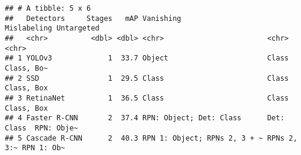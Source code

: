 \begin{verbatim}
## # A tibble: 5 x 6
##   Detectors     Stages   mAP Vanishing                    Mislabeling Untargeted
##   <chr>          <dbl> <dbl> <chr>                        <chr>       <chr>     
## 1 YOLOv3             1  33.7 Object                       Class       Class, Bo~
## 2 SSD                1  29.5 Class                        Class       Class, Box
## 3 RetinaNet          1  36.5 Class                        Class       Class, Box
## 4 Faster R-CNN       2  37.4 RPN: Object; Det: Class      Det: Class  RPN: Obje~
## 5 Cascade R-CNN      2  40.3 RPN 1: Object; RPNs 2, 3 + ~ RPNs 2, 3:~ RPN 1: Ob~
\end{verbatim}

\begin{Shaded}
\begin{Highlighting}[]
\OtherTok{\textless{}{-}}  \NormalTok{) \{}
  \NormalTok{(}\NormalTok{)}
\NormalTok{\}}

\OtherTok{\textless{}{-}} 
\SpecialCharTok{|\textgreater{}} \NormalTok{(}\NormalTok{(}
\NormalTok{\}}

\OtherTok{\textless{}{-}} 
  \NormalTok{(}\NormalTok{(} \OtherTok{=} \NormalTok{, } \OtherTok{=} \NormalTok{)))}
\NormalTok{\}}

\OtherTok{\textless{}{-}}\SpecialCharTok{|\textgreater{}}
  \NormalTok{(} \SpecialCharTok{:=} \SpecialCharTok{:=} \SpecialCharTok{:=}\SpecialCharTok{|\textgreater{}}
  \NormalTok{(}\NormalTok{(}\SpecialCharTok{|\textgreater{}}
  \NormalTok{()}

\end{Highlighting}
\end{Shaded}

